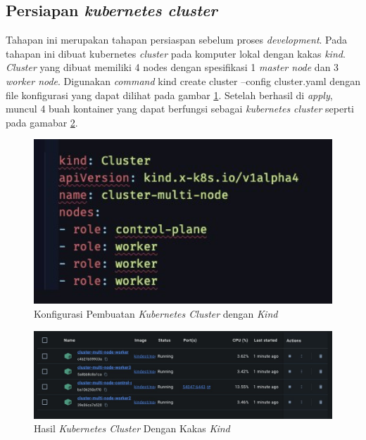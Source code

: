 \subsection{Persiapan \textit{kubernetes cluster}}
\label{subsec:persiapan-kubernetes-cluster}

Tahapan ini merupakan tahapan persiaspan sebelum proses \textit{development}. Pada tahapan ini dibuat kubernetes \textit{cluster} pada komputer lokal dengan kakas \textit{kind}. \textit{Cluster} yang dibuat memiliki 4 nodes dengan spesifikasi 1 \textit{master node} dan 3 \textit{worker node}. Digunakan \textit{command} kind create cluster --config cluster.yaml dengan file konfigurasi yang dapat dilihat pada gambar \ref{fig:konfigurasi-pembuatan-cluster}. Setelah berhasil di \textit{apply}, muncul 4 buah kontainer yang dapat berfungsi sebagai \textit{kubernetes cluster} seperti pada gamabar \ref{fig:hasil-cluster-kind}.

\begin{figure}[ht]
  \centering
  \includegraphics[width=1\textwidth]{resources/appendix/pembuatan-cluster.jpg}
  \caption{Konfigurasi Pembuatan \textit{Kubernetes Cluster} dengan \textit{Kind}}
  \label{fig:konfigurasi-pembuatan-cluster}
\end{figure}

\begin{figure}[ht]
  \centering
  \includegraphics[width=1\textwidth]{resources/chapter-4/cluster-kind.jpg}
  \caption{Hasil \textit{Kubernetes Cluster} Dengan Kakas \textit{Kind}}
  \label{fig:hasil-cluster-kind}
\end{figure}

\pagebreak
